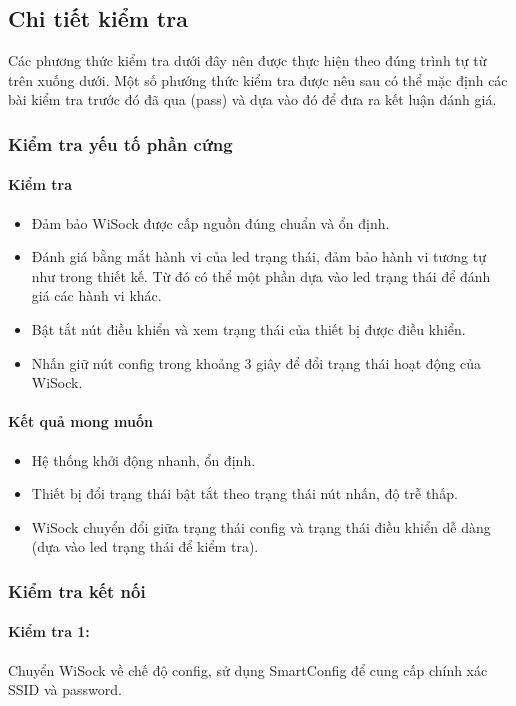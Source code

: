 \documentclass[a4paper]{article}
\begin{document}
\subsection{Chi tiết kiểm tra}
Các phương thức kiểm tra dưới đây nên được thực hiện theo đúng trình tự từ trên xuống dưới. Một số phướng thức kiểm tra được nêu sau có thể mặc định các bài kiểm tra trước đó đã qua (pass) và dựa vào đó để đưa ra kết luận đánh giá.
\subsubsection{Kiểm tra yếu tố phần cứng}
\paragraph*{Kiểm tra}
\begin{itemize}
	\item Đảm bảo WiSock được cấp nguồn đúng chuẩn và ổn định.
	\item Đánh giá bằng mắt hành vi của led trạng thái, đảm bảo hành vi tương tự như trong thiết kế. Từ đó có thể một phần dựa vào led trạng thái để đánh giá các hành vi khác.
	\item Bật tắt nút điều khiển và xem trạng thái của thiết bị được điều khiển.
	\item Nhấn giữ nút config trong khoảng 3 giây để đổi trạng thái hoạt động của WiSock.
\end{itemize}
\paragraph*{Kết quả mong muốn}
\begin{itemize}
	\item Hệ thống khởi động nhanh, ổn định.
	\item Thiết bị đổi trạng thái bật tắt theo trạng thái nút nhấn, độ trễ thấp.
	\item WiSock chuyển đổi giữa trạng thái config và trạng thái điều khiển dễ dàng (dựa vào led trạng thái để kiểm tra).
\end{itemize}
\subsubsection{Kiểm tra kết nối}
\paragraph*{Kiểm tra 1:}
Chuyển WiSock về chế độ config, sử dụng SmartConfig để cung cấp chính xác SSID và password.
\end{document}
